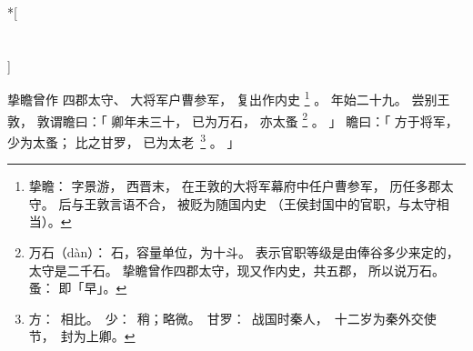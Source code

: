 
\pagebreak
\switchcolumn[0]*[\section{}]

挚瞻曾作
四郡太守、
大将军户曹参军，
复出作内史%
\footnote{%
    挚瞻：
        字景游，
        西晋末，
        在王敦的大将军幕府中任户曹参军，
        历任多郡太守。
        后与王敦言语不合，
        被贬为随国内史
        （王侯封国中的官职，与太守相当）。
}%
。
年始二十九。
尝别王敦，
敦谓瞻曰：「
    卿年未三十，
    已为万石，
    亦太蚤%
    \footnote{%
        万石（dàn）：
            石，容量单位，为十斗。
            表示官职等级是由俸谷多少来定的，
            太守是二千石。
            挚瞻曾作四郡太守，现又作内史，共五郡，
            所以说万石。
        蚤：
            即「早」。
    }%
    。
」
瞻曰：「
    方于将军，
    少为太蚤；
    比之甘罗，
    已为太\mbox{老%
    \footnote{%
        方：
            相比。
        少：
            稍；略微。
        甘罗：
            战国时秦人，
            十二岁为秦外交使节，
            封为上卿。
    }}%
    。
」

\switchcolumn



